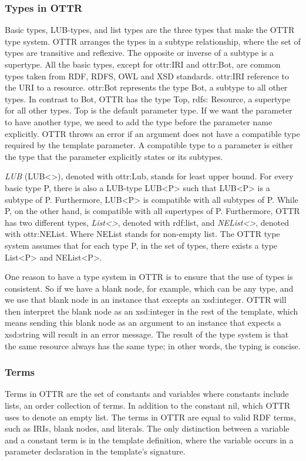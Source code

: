 \subsubsection{Types in OTTR}
\label{ottr types}
Basic types, LUB-types, and list types are the three types that make the OTTR type system. OTTR arranges the types in a subtype relationship, where the set of types are transitive and reflexive. The opposite or inverse of a subtype is a supertype. All the basic types, except for ottr:IRI and ottr:Bot, are common types taken from RDF, RDFS, OWL and XSD standards. ottr:IRI reference to the URI to a resource. ottr:Bot represents the type Bot, a subtype to all other types. In contrast to Bot, OTTR has the type Top, rdfs: Resource, a supertype for all other types.  Top is the default parameter type. If we want the parameter to have another type, we need to add the type before the parameter name explicitly. OTTR throws an error if an argument does not have a compatible type required by the template parameter.  A compatible type to a parameter is either the type that the parameter explicitly states or its subtypes. 

\para
\emph{LUB} (LUB<>), denoted with ottr:Lub, stands for least upper bound. For every basic type P, there is also a LUB-type LUB<P> such that LUB<P> is a subtype of P. Furthermore, LUB<P> is compatible with all subtypes of P. While P, on the other hand, is compatible with all supertypes of P. Furthermore, OTTR has two different types, \emph{List<>}, denoted with rdf:list, and \emph{NEList<>}, denoted with ottr:NEList. Where NEList stands for non-empty list. The OTTR type system assumes that for each type P, in the set of types, there exists a type List<P> and NEList<P>.

\para
One reason to have a type system in OTTR is to ensure that the use of types is consistent. So if we have a blank node, for example, which can be any type, and we use that blank node in an instance that excepts an xsd:integer. OTTR will then interpret the blank node as an xsd:integer in the rest of the template, which means sending this blank node as an argument to an instance that expects a xsd:string will result in an error message. The result of the type system is that the same resource always has the same type; in other words, the typing is concise. 

\subsubsection{Terms}
Terms in OTTR are the set of constants and variables where constants include lists, an order collection of terms. In addition to the constant nil, which OTTR uses to denote an empty list. The terms in OTTR are equal to valid RDF terms, such as IRIs, blank nodes, and literals. The only distinction between a variable and a constant term is in the template definition, where the variable occurs in a parameter declaration in the template's signature.